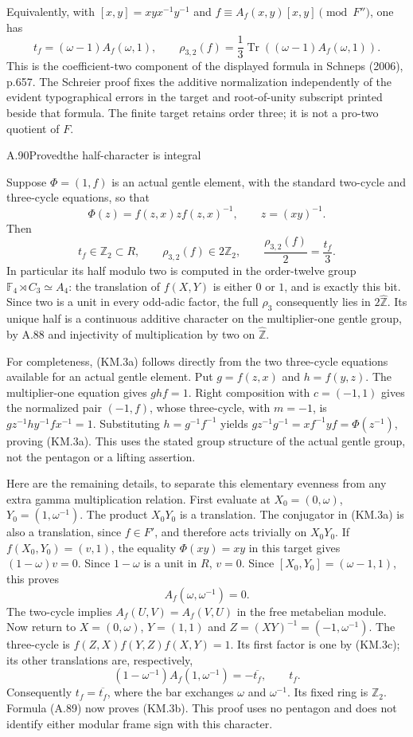 Equivalently, with $[x,y]=xyx^{-1}y^{-1}$ and
$f\equiv A_f(x,y)[x,y]\pmod{F''}$, one has
\[
 t_f=(\omega-1)A_f(\omega,1),\qquad
 \rho_{3,2}(f)=\frac13\operatorname{Tr}
       ((\omega-1)A_f(\omega,1)).
\]
This is the coefficient-two component of the displayed formula
in Schneps (2006), p.657.  The Schreier proof fixes the additive
normalization independently of the evident typographical errors
in the target and root-of-unity subscript printed beside that formula.
The finite target retains order three; it is not a pro-two
quotient of $F$.

\begin{statement}{A.90}{Proved}{the half-character is integral}
\end{statement}
Suppose $\Phi=(1,f)$ is an actual gentle element, with the standard
two-cycle and three-cycle equations, so that
\[
 \Phi(z)=f(z,x)z f(z,x)^{-1},\qquad z=(xy)^{-1}.
 \tag{KM.3a}
\]
Then
\[
 t_f\in\mathbb Z_2\subset R,\qquad
 \rho_{3,2}(f)\in2\mathbb Z_2,\qquad
 \frac{\rho_{3,2}(f)}2=\frac{t_f}3.
 \tag{KM.3b}
\]
In particular its half modulo two is computed in the order-twelve
group $\mathbb F_4\rtimes C_3\simeq A_4$: the translation of
$f(X,Y)$ is either $0$ or $1$, and is exactly this bit.
Since two is a unit in every odd-adic factor, the full
$\rho_3$ consequently lies in $2\widehat{\mathbb Z}$.
Its unique half is a continuous additive character on the
multiplier-one gentle group, by A.88 and injectivity of
multiplication by two on $\widehat{\mathbb Z}$.

For completeness, (KM.3a) follows directly from the two three-cycle
equations available for an actual gentle element.
Put $g=f(z,x)$ and $h=f(y,z)$. The multiplier-one equation gives
$ghf=1$. Right composition with $c=(-1,1)$ gives the normalized
pair $(-1,f)$, whose three-cycle, with $m=-1$, is
$gz^{-1}hy^{-1}fx^{-1}=1$. Substituting $h=g^{-1}f^{-1}$ yields
$gz^{-1}g^{-1}=xf^{-1}yf=\Phi(z^{-1})$, proving (KM.3a).
This uses the stated group structure of the actual gentle group,
not the pentagon or a lifting assertion.

Here are the remaining details, to separate this elementary evenness from
any extra gamma multiplication relation. First evaluate at
$X_0=(0,\omega)$, $Y_0=(1,\omega^{-1})$.  The product
$X_0Y_0$ is a translation.  The conjugator in (KM.3a) is also a
translation, since $f\in F'$, and therefore acts trivially on
$X_0Y_0$.  If $f(X_0,Y_0)=(v,1)$, the equality
$\Phi(xy)=xy$ in this target gives
$(1-\omega)v=0$.  Since $1-\omega$ is a unit in $R$, $v=0$.
Since $[X_0,Y_0]=(\omega-1,1)$, this proves
\[
 A_f(\omega,\omega^{-1})=0.
 \tag{KM.3c}
\]
The two-cycle implies $A_f(U,V)=A_f(V,U)$ in the free
metabelian module.  Now return to $X=(0,\omega)$,
$Y=(1,1)$ and $Z=(XY)^{-1}=(-1,\omega^{-1})$.
The three-cycle is
$f(Z,X)f(Y,Z)f(X,Y)=1$.  Its first factor is one by
(KM.3c); its other translations are, respectively,
\[
 (1-\omega^{-1})A_f(1,\omega^{-1})=-\overline{t_f},
 \qquad t_f.
\]
Consequently $t_f=\overline{t_f}$, where the bar exchanges
$\omega$ and $\omega^{-1}$.  Its fixed ring is $\mathbb Z_2$.
Formula (A.89) now proves (KM.3b).  This proof uses no pentagon
and does not identify either modular frame sign with this character.

